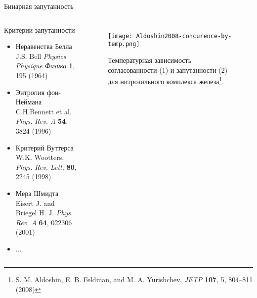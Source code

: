 \begin{frame}{Бинарная запутанность}
  \begin{columns}
    \begin{block}{Критерии запутанности}
      \begin{itemize}
        \item Неравенства Белла \\
          {\footnotesize J.S. Bell \textit{Physics Physique Физика} \textbf{1}, 195 (1964)}
        \item Энтропия фон-Неймана \\
          {\footnotesize C.H.Bennett et al. \textit{Phys. Rev. A} \textbf{54}, 3824 (1996)}
        \item Критерий Вуттерса \\
          {\footnotesize W.K. Wootters, \textit{Phys. Rev. Lett.} \textbf{80}, 2245 (1998)}
        \item Мера Шмидта \\
          {\footnotesize Eisert J. and Briegel H. J. \textit{Phys. Rev. A} \textbf{64}, 022306 (2001)}
        \item ...
      \end{itemize}
    \end{block}


    \begin{figure}
      \texttt{[image: Aldoshin2008-concurence-by-temp.png]}
      \captionsetup{skip=-2mm}
      \caption{Температурная зависимость согласованности (1) и запутанности (2) для нитрозильного комплекса железа\footnote[frame]{S. M. Aldoshin, E. B. Feldman, and M. A. Yurishchev, \textit{JETP} \textbf{107}, 5, 804–811 (2008)}.}
    \end{figure}
  \end{columns}
\end{frame}

